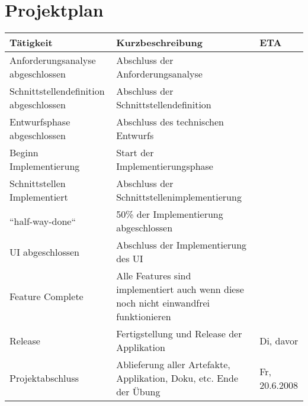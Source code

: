 

\section{Projektplan}

\begin{tabular}{ | p{4cm} | p{8cm} |  p{3cm} |}
\hline
\textbf{Tätigkeit} & \textbf{Kurzbeschreibung} & \textbf{ETA} \\
\hline
Anforderungsanalyse abgeschlossen &	Abschluss der Anforderungsanalyse & \\
\hline
Schnittstellendefinition abgeschlossen & Abschluss der Schnittstellendefinition & \\
\hline
Entwurfsphase abgeschlossen	& Abschluss des technischen Entwurfs	 & \\
\hline
Beginn Implementierung &	Start der Implementierungsphase	 & \\
\hline
Schnittstellen Implementiert & Abschluss der Schnittstellenimplementierung & \\
\hline
``half-way-done`` & 50\% der Implementierung abgeschlossen & \\
\hline 
UI abgeschlossen &	Abschluss der Implementierung des UI &	\\
\hline
Feature Complete &	Alle Features sind implementiert auch wenn diese noch nicht einwandfrei funktionieren & \\
\hline
Release &	Fertigstellung und Release der Applikation	& Di, davor \\
\hline
Projektabschluss &	Ablieferung aller Artefakte, Applikation, Doku, etc. Ende der Übung	& Fr, 20.6.2008 \\
\hline
\end{tabular}